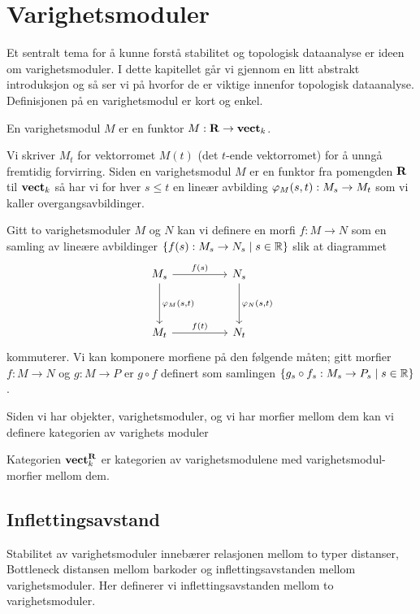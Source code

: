 \section{Varighetsmoduler}


Et sentralt tema for å kunne forstå stabilitet og topologisk dataanalyse er ideen om varighetsmoduler. I dette kapitellet går vi gjennom en litt abstrakt introduksjon og så ser vi på hvorfor de er viktige innenfor topologisk dataanalyse. Definisjonen på en varighetsmodul er kort og enkel.

\begin{definisjon}\label{Def:PersMod}
    En varighetsmodul $M$ er en funktor $M:\textnormal{\textbf{{R}}}\to\textnormal{\textbf{vect}}_k$.
\end{definisjon}

Vi skriver $M_t$ for vektorromet $M(t)$ (det $t$-ende vektorromet) for å unngå fremtidig forvirring.
Siden en varighetsmodul $M$ er en funktor fra pomengden $\textnormal{\textbf{{R}}}$ til $\textnormal{\textbf{vect}}_k$ så har vi for hver $s\leq t$ en lineær avbilding $\varphi_M(s,t): M_s\to M_t$ som vi kaller overgangsavbildinger.

Gitt to varighetsmoduler $M$ og $N$ kan vi definere en morfi $f: M\to N$ som en samling av lineære avbildinger
$\{f(s): M_s\to N_s\;|\; s\in\mathbb{R}\}$ slik at diagrammet
\[
\begin{tikzcd}
	{M_s} && {N_s} \\
	\\
	{M_t} && {N_t}
	\arrow["{f(s)}", from=1-1, to=1-3]
	\arrow["{\p_M(s,t)}", from=1-1, to=3-1]
	\arrow["{\p_N(s,t)}", from=1-3, to=3-3]
	\arrow["{f(t)}", from=3-1, to=3-3]
\end{tikzcd}
\]
kommuterer. Vi kan komponere morfiene på den følgende måten; gitt morfier $f:M\to N$ og $g:M\to P$ er $g\circ f$
definert som samlingen $\{g_s\circ f_s: M_s\to P_s\;|\;s\in\mathbb{R}\}$.

Siden vi har objekter, varighetsmoduler, og vi har morfier mellom dem kan vi definere kategorien av varighets moduler

\begin{definisjon}\label{Def:KatPMod}
    Kategorien $\textnormal{\textbf{vect}}_k^{\textnormal{\textbf{{R}}}}$ er kategorien av varighetsmodulene med varighetsmodul-morfier mellom dem.
\end{definisjon}
\subsection{Inflettingsavstand}
Stabilitet av varighetsmoduler innebærer relasjonen mellom to typer distanser, Bottleneck distansen mellom barkoder
og inflettingsavstanden mellom varighetsmoduler. Her definerer vi inflettingsavstanden mellom to varighetsmoduler.


